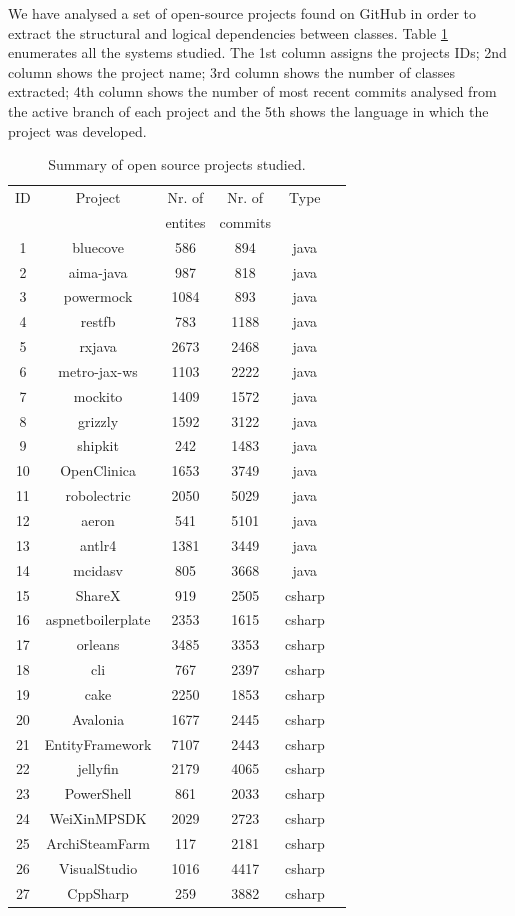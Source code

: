 \documentclass[a4paper,twoside]{article}
\begin{document}
We have analysed a set of open-source projects found on GitHub in order to extract the structural and logical dependencies between classes. Table \ref{table:1} enumerates all the systems studied. The 1st column assigns the projects IDs; 2nd column shows the project name; 3rd column shows the number of classes extracted; 4th column shows the number of most recent commits analysed from the active branch of each project and the 5th shows the language in which the project was developed.
\begin{table}[!h]
\caption{Summary of open source projects studied.}
\label{table:1}
\centering
\begin{tabular}{|c|c|c|c|c|c|}
\hline
   ID  & Project    & Nr. of & Nr. of& Type\\
     &     & entites & commits & \\
\hline
1	&	bluecove	&	586	&	894	&	java	\\
2	&	aima-java	&	987	&	818	&	java	\\
3	&	powermock	&	1084	&	893	&	java	\\
4	&	restfb	&	783	&	1188	&	java	\\
5	&	rxjava	&	2673	&	2468	&	java	\\
6	&	metro-jax-ws	&	1103	&	2222	&	java	\\
7	&	mockito	&	1409	&	1572	&	java	\\
8	&	grizzly	&	1592	&	3122	&	java	\\
9	&	shipkit	&	242	&	1483	&	java	\\
10	&	OpenClinica	&	1653	&	3749	&	java	\\
11	&	robolectric	&	2050	&	5029	&	java	\\
12	&	aeron	&	541	&	5101	&	java	\\
13	&	antlr4	&	1381	&	3449	&	java	\\
14	&	mcidasv	&	805	&	3668	&	java	\\
15	&	ShareX	&	919	&	2505	&	csharp	\\
16	&	aspnetboilerplate	&	2353	&	1615	&	csharp	\\
17	&	orleans	&	3485	&	3353	&	csharp	\\
18	&	cli	&	767	&	2397	&	csharp	\\
19	&	cake	&	2250	&	1853	&	csharp	\\
20	&	Avalonia	&	1677	&	2445	&	csharp	\\
21	&	EntityFramework	&	7107	&	2443	&	csharp	\\
22	&	jellyfin	&	2179	&	4065	&	csharp	\\
23	&	PowerShell	&	861	&	2033	&	csharp	\\
24	&	WeiXinMPSDK	&	2029	&	2723	&	csharp	\\
25	&	ArchiSteamFarm	&	117	&	2181	&	csharp	\\
26	&	VisualStudio	&	1016	&	4417	&	csharp	\\
27	&	CppSharp	&	259	&	3882	&	csharp	\\
\hline
\end{tabular}
\end{table}
\end{document}
